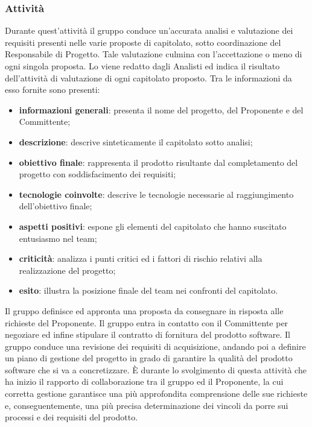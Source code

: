     \subsubsection{Attività}
    Durante quest'attività il gruppo conduce un'accurata analisi e valutazione dei requisiti presenti nelle varie proposte di capitolato, sotto coordinazione del Responsabile di Progetto. Tale valutazione culmina con l'accettazione o meno di ogni singola proposta.
    Lo \SdF{} viene redatto dagli Analisti ed indica il risultato dell'attività di valutazione di ogni capitolato proposto. Tra le informazioni da esso fornite sono presenti:
    \begin{itemize}
        \item{\textbf{informazioni generali}: presenta il nome del progetto, del Proponente e del Committente;}
        \item{\textbf{descrizione}: descrive sinteticamente il capitolato sotto analisi;}
        \item{\textbf{obiettivo finale}: rappresenta il prodotto risultante dal completamento del progetto con soddisfacimento dei requisiti;}
        \item{\textbf{tecnologie coinvolte}: descrive le tecnologie necessarie al raggiungimento dell'obiettivo finale;}
        \item{\textbf{aspetti positivi}: espone gli elementi del capitolato che hanno suscitato entusiasmo nel team;}
        \item{\textbf{criticità}: analizza i punti critici ed i fattori di rischio relativi alla realizzazione del progetto;}
        \item{\textbf{esito}: illustra la posizione finale del team nei confronti del capitolato.}
    \end{itemize}
    Il gruppo definisce ed appronta una proposta da consegnare in risposta alle richieste del Proponente.
    Il gruppo entra in contatto con il Committente per negoziare ed infine stipulare il contratto di fornitura del prodotto software.
    Il gruppo conduce una revisione dei requisiti di acquisizione, andando poi a definire un piano di gestione del progetto in grado di garantire la qualità del prodotto software che si va a concretizzare. È durante lo svolgimento di questa attività che ha inizio il rapporto di collaborazione tra il gruppo ed il Proponente, la cui corretta gestione garantisce una più approfondita comprensione delle sue richieste e, conseguentemente, una più precisa determinazione dei vincoli da porre sui processi e dei requisiti del prodotto.
